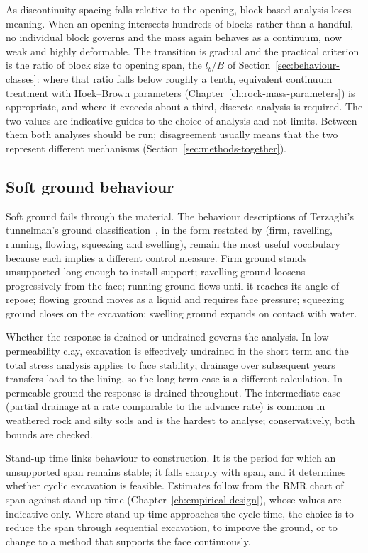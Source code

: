 As discontinuity spacing falls relative to the opening, block-based analysis
loses meaning. When an opening intersects hundreds of blocks rather than a
handful, no individual block governs and the mass again behaves as a
continuum, now weak and highly deformable. The transition is gradual and the
practical criterion is the ratio of block size to opening span, the $l_b/B$
of Section~\ref{sec:behaviour-classes}: where
that ratio falls below roughly a tenth, equivalent continuum treatment with
Hoek--Brown parameters (Chapter~\ref{ch:rock-mass-parameters}) is appropriate,
and where it exceeds about a third, discrete analysis is required. The two
values are indicative guides to the choice of analysis and not limits. Between them both analyses should be run;
disagreement usually means that the two represent different mechanisms
(Section~\ref{sec:methods-together}).

\subsection{Soft ground behaviour}
\label{sec:soft-ground-behaviour}

Soft ground fails through the material. The behaviour descriptions of
Terzaghi's tunnelman's ground classification~\citep{terzaghi1950geologic}, in
the form restated by \citet{heuer1974important} (firm, ravelling, running,
flowing, squeezing and swelling),
remain the most useful vocabulary because each implies a different control
measure. Firm ground stands unsupported long enough to install support;
ravelling ground loosens progressively from the face; running ground flows
until it reaches its angle of repose; flowing ground moves as a liquid and
requires face pressure; squeezing ground closes on the excavation; swelling
ground expands on contact with water.

Whether the response is drained or undrained governs the analysis. In
low-permeability clay, excavation is effectively undrained in the short term
and the total stress analysis applies to face stability; drainage over
subsequent years transfers load to the lining, so the long-term case is a
different calculation. In permeable ground the response is drained
throughout. The intermediate case (partial drainage at a rate comparable to
the advance rate) is common in weathered rock and silty soils and is the
hardest to analyse; conservatively, both bounds are checked.

Stand-up time links behaviour to construction. It is the period for which an unsupported
span remains stable; it falls sharply with span, and it determines
whether cyclic excavation is feasible. Estimates follow from the RMR
chart of span against stand-up time (Chapter~\ref{ch:empirical-design}),
whose values are indicative only. Where stand-up time approaches
the cycle time, the choice is to reduce the span through sequential
excavation, to improve the ground, or to change to a method that supports the
face continuously.

